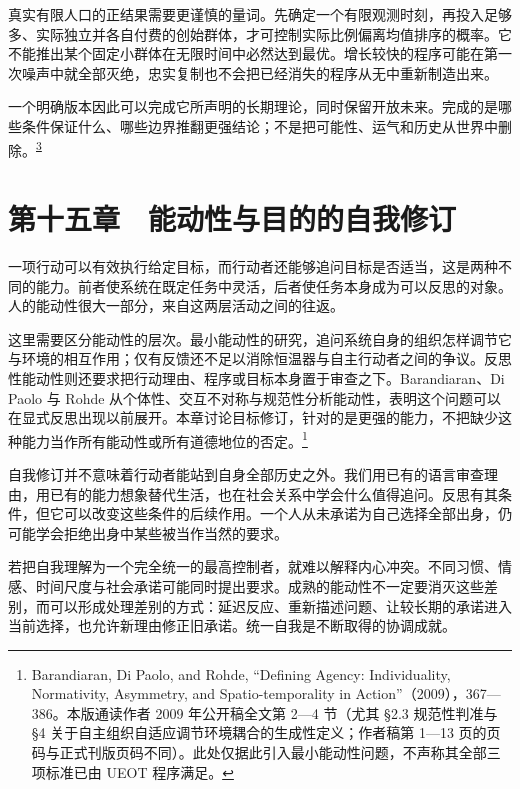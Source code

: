 \documentclass[
  11pt,
  oneside]{book}
\begin{document}
真实有限人口的正结果需要更谨慎的量词。先确定一个有限观测时刻，再投入足够多、实际独立并各自付费的创始群体，才可控制实际比例偏离均值排序的概率。它不能推出某个固定小群体在无限时间中必然达到最优。增长较快的程序可能在第一次噪声中就全部灭绝，忠实复制也不会把已经消失的程序从无中重新制造出来。

\begingroup{}

一个明确版本因此可以完成它所声明的长期理论，同时保留开放未来。完成的是哪些条件保证什么、哪些边界推翻更强结论；不是把可能性、运气和历史从世界中删除。\textsuperscript{\hyperlink{ph-note-3}{3}}

\par\endgroup

\chapter{第十五章　能动性与目的的自我修订}\label{ph-ch-15}

一项行动可以有效执行给定目标，而行动者还能够追问目标是否适当，这是两种不同的能力。前者使系统在既定任务中灵活，后者使任务本身成为可以反思的对象。人的能动性很大一部分，来自这两层活动之间的往返。

这里需要区分能动性的层次。最小能动性的研究，追问系统自身的组织怎样调节它与环境的相互作用；仅有反馈还不足以消除恒温器与自主行动者之间的争议。反思性能动性则还要求把行动理由、程序或目标本身置于审查之下。Barandiaran、Di Paolo 与 Rohde 从个体性、交互不对称与规范性分析能动性，表明这个问题可以在显式反思出现以前展开。本章讨论目标修订，针对的是更强的能力，不把缺少这种能力当作所有能动性或所有道德地位的否定。\footnote{\hypertarget{ph-note-39}{}Barandiaran, Di Paolo, and Rohde, ``Defining Agency: Individuality, Normativity, Asymmetry, and Spatio-temporality in Action''（2009），367---386。本版通读作者 2009 年公开稿全文第 2---4 节（尤其 §2.3 规范性判准与 §4 关于自主组织自适应调节环境耦合的生成性定义；作者稿第 1---13 页的页码与正式刊版页码不同）。此处仅据此引入最小能动性问题，不声称其全部三项标准已由 UEOT 程序满足。}

自我修订并不意味着行动者能站到自身全部历史之外。我们用已有的语言审查理由，用已有的能力想象替代生活，也在社会关系中学会什么值得追问。反思有其条件，但它可以改变这些条件的后续作用。一个人从未承诺为自己选择全部出身，仍可能学会拒绝出身中某些被当作当然的要求。

若把自我理解为一个完全统一的最高控制者，就难以解释内心冲突。不同习惯、情感、时间尺度与社会承诺可能同时提出要求。成熟的能动性不一定要消灭这些差别，而可以形成处理差别的方式：延迟反应、重新描述问题、让较长期的承诺进入当前选择，也允许新理由修正旧承诺。统一自我是不断取得的协调成就。
\end{document}
